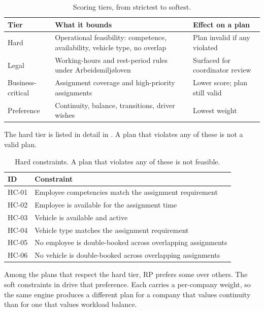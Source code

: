 \begin{table}[h]
\centering
\caption{Scoring tiers, from strictest to softest.}
\label{tab:scoring-tiers}
\small
\begin{tabularx}{\textwidth}{@{}
  p{}
  X
  p{}
@{}}
\toprule
\textbf{Tier} & \textbf{What it bounds} & \textbf{Effect on a plan} \\
\midrule
Hard              & Operational feasibility: competence, availability, vehicle type, no overlap & Plan invalid if any violated \\
Legal             & Working-hours and rest-period rules under Arbeidsmiljøloven                  & Surfaced for coordinator review \\
Business-critical & Assignment coverage and high-priority assignments                            & Lower score; plan still valid \\
Preference        & Continuity, balance, transitions, driver wishes                              & Lowest weight \\
\bottomrule
\end{tabularx}
\end{table}

The hard tier is listed in detail in . A plan that violates any of these is not a valid plan.

\begin{table}[h]
\centering
\caption{Hard constraints. A plan that violates any of these is not feasible.}
\label{tab:hard-constraints}
\small
\begin{tabularx}{\textwidth}{@{}
  p{}
  X
@{}}
\toprule
\textbf{ID} & \textbf{Constraint} \\
\midrule
HC-01 & Employee competencies match the assignment requirement \\
HC-02 & Employee is available for the assignment time \\
HC-03 & Vehicle is available and active \\
HC-04 & Vehicle type matches the assignment requirement \\
HC-05 & No employee is double-booked across overlapping assignments \\
HC-06 & No vehicle is double-booked across overlapping assignments \\
\bottomrule
\end{tabularx}
\end{table}

Among the plans that respect the hard tier, RP prefers some over others. The soft constraints in  drive that preference. Each carries a per-company weight, so the same engine produces a different plan for a company that values continuity than for one that values workload balance.

